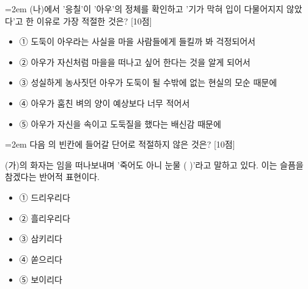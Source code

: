 \documentclass[11pt,a4paper]{article}
\newcommand{\qnum}[1]{%
  \tikz[baseline=(num.base)]{%
    \node[circle, fill=numCircle, text=white, inner sep=0pt,
          minimum size=18pt, font=\small\bfseries] (num) {#1};%
  }%
}
\newcommand{\pts}[1]{%
  \hfill\textcolor{ptsBadge}{[#1점]}%
}
\begin{document}
\vspace{4mm}
\begin{minipage}{\columnwidth}
{\hangindent=2em
\qnum{2}\enspace (나)에서 '응칠'이 '아우'의 정체를 확인하고 '기가 막혀 입이 다물어지지 않았다'고 한 이유로 가장 적절한 것은? \pts{10}
\par}

\vspace{3mm}
\begin{itemize}[leftmargin=2.5em, labelsep=0.3em, label={}, itemsep=4pt, parsep=1pt, topsep=0pt]
  \item ① 도둑이 아우라는 사실을 마을 사람들에게 들킬까 봐 걱정되어서
  \item ② 아우가 자신처럼 마을을 떠나고 싶어 한다는 것을 알게 되어서
  \item ③ 성실하게 농사짓던 아우가 도둑이 될 수밖에 없는 현실의 모순 때문에
  \item ④ 아우가 훔친 벼의 양이 예상보다 너무 적어서
  \item ⑤ 아우가 자신을 속이고 도둑질을 했다는 배신감 때문에
\end{itemize}
\end{minipage}
\vspace{4mm}

\vspace{4mm}
\begin{minipage}{\columnwidth}
{\hangindent=2em
\qnum{3}\enspace 다음 의 빈칸에 들어갈 단어로 적절하지 않은 것은? \pts{10}
\par}

\vspace{3mm}
\begin{tcolorbox}[bogi]
(가)의 화자는 임을 떠나보내며 '죽어도 아니 눈물 (          )'라고 말하고 있다. 이는 슬픔을 참겠다는 반어적 표현이다.
\end{tcolorbox}
\vspace{3mm}
\begin{itemize}[leftmargin=2.5em, labelsep=0.3em, label={}, itemsep=4pt, parsep=1pt, topsep=0pt]
  \item ① 드리우리다
  \item ② 흘리우리다
  \item ③ 삼키리다
  \item ④ 쏟으리다
  \item ⑤ 보이리다
\end{itemize}
\end{minipage}
\vspace{4mm}
\end{document}
